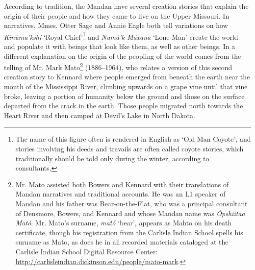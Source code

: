 According to tradition, the Mandan have several creation stories that explain the origin of their people and how they came to live on the Upper Missouri. In  narratives, Mmes. Otter Sage and Annie Eagle both tell variations on how \textit{Kinúma'kshi} `Royal Chief'\footnote{The name of this figure often is rendered in English as `Old Man Coyote', and stories involving his deeds and travails are often called coyote stories, which traditionally should be told only during the winter, according to consultants.} and \textit{Numá'k Máxana} `Lone Man' create the world and populate it with beings that look like them, as well as other beings. In a different explanation on the origin of the peopling of the world comes from the telling of Mr. Mark Mato\footnote{Mr. Mato assisted both Bowers and Kennard with their translations of Mandan narratives and traditional accounts. He was an L1 speaker of Mandan and his father was Bear-on-the-Flat, who was a principal consultant of Densmore, Bowers, and Kennard and whose Mandan name was \textit{Ópshiitaa Mató}. Mr. Mato's surname, \textit{mató} `bear', appears as Mahto on his death certificate, though his registration from the Carlisle Indian School spells his surname as Mato, as does he in all recorded materials cataloged at the Carlisle Indian School Digital Resource Center: \href{http://carlisleindian.dickinson.edu/people/mato-mark}{http://carlisleindian.dickinson.edu/people/mato-mark}.} (1886--1964), who relates a version of this second creation story to Kennard where people emerged from beneath the earth near the mouth of the Mississippi River, climbing upwards on a grape vine until that vine broke, leaving a portion of humanity below the ground and those on the surface departed from the crack in the earth. Those people migrated north towards the Heart River and then camped at Devil's Lake in North Dakota.

